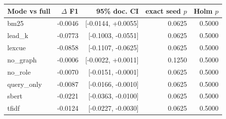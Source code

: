 \begin{tabular}{lrrrr}
\toprule
Mode vs full & $\Delta$ F1 & 95\% doc. CI & exact seed $p$ & Holm $p$ \\
\midrule
bm25 & -0.0046 & [-0.0144, +0.0055] & 0.0625 & 0.5000 \\
lead\_k & -0.0773 & [-0.1003, -0.0551] & 0.0625 & 0.5000 \\
lexcue & -0.0858 & [-0.1107, -0.0625] & 0.0625 & 0.5000 \\
no\_graph & -0.0006 & [-0.0022, +0.0011] & 0.1250 & 0.5000 \\
no\_role & -0.0070 & [-0.0151, -0.0001] & 0.0625 & 0.5000 \\
query\_only & -0.0087 & [-0.0166, -0.0010] & 0.0625 & 0.5000 \\
sbert & -0.0221 & [-0.0363, -0.0100] & 0.0625 & 0.5000 \\
tfidf & -0.0124 & [-0.0227, -0.0030] & 0.0625 & 0.5000 \\
\bottomrule
\end{tabular}
